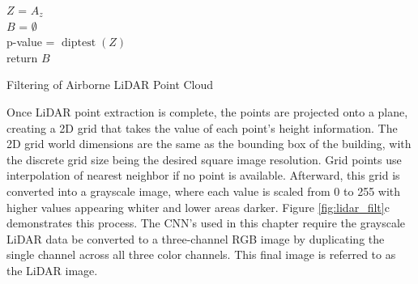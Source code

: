\begin{algorithm}[H]

    $Z$ = $A_z$ \\
    $B$ = $\emptyset$ \\
    p-value = $\operatorname{diptest}(Z)$ \\
    return $B$
    \caption{Filtering of Airborne LiDAR Point Cloud}
    \label{alg:filter}
\end{algorithm}
\vspace{12PT}


Once LiDAR point extraction is complete, the points are projected onto a plane, creating a 2D grid that takes the value of each point's height information. The 2D grid world dimensions are the same as the bounding box of the building, with the discrete grid size being the desired square image resolution. Grid points use interpolation of nearest neighbor if no point is available. Afterward, this grid is converted into a grayscale image, where each value is scaled from 0 to 255 with higher values appearing whiter and lower areas darker. Figure \ref{fig:lidar_filt}c demonstrates this process. The \ac{CNN}'s used in this chapter require the grayscale LiDAR data be converted to a three-channel RGB image by duplicating the single channel across all three color channels. This final image is referred to as the LiDAR image.

